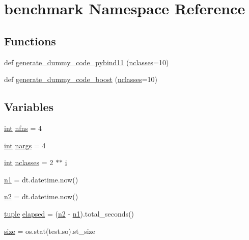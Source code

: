 \hypertarget{namespacebenchmark}{}\section{benchmark Namespace Reference}
\label{namespacebenchmark}
\subsection*{Functions}
\begin{DoxyCompactItemize}
\item 
def \mbox{\hyperlink{namespacebenchmark_a5359521e823a327e1afc7a83d99fa73e}{generate\+\_\+dummy\+\_\+code\+\_\+pybind11}} (\mbox{\hyperlink{namespacebenchmark_ae3ff13572a7f8a6a9bf2bff520478379}{nclasses}}=10)
\item 
def \mbox{\hyperlink{namespacebenchmark_a714bbeed8f2f2b196b7ef86e3d37f312}{generate\+\_\+dummy\+\_\+code\+\_\+boost}} (\mbox{\hyperlink{namespacebenchmark_ae3ff13572a7f8a6a9bf2bff520478379}{nclasses}}=10)
\end{DoxyCompactItemize}
\subsection*{Variables}
\begin{DoxyCompactItemize}
\item 
\mbox{\hyperlink{warnings_8h_a74f207b5aa4ba51c3a2ad59b219a423b}{int}} \mbox{\hyperlink{namespacebenchmark_a08ef92e0d411609912c8368efd85e34e}{nfns}} = 4
\item 
\mbox{\hyperlink{warnings_8h_a74f207b5aa4ba51c3a2ad59b219a423b}{int}} \mbox{\hyperlink{namespacebenchmark_aad31ff2d4ed162d708367b63f9484c97}{nargs}} = 4
\item 
\mbox{\hyperlink{warnings_8h_a74f207b5aa4ba51c3a2ad59b219a423b}{int}} \mbox{\hyperlink{namespacebenchmark_ae3ff13572a7f8a6a9bf2bff520478379}{nclasses}} = 2 $\ast$$\ast$ \mbox{\hyperlink{abstract_8h_a13235ab5ddf5c2ccd5ca35ab01d91328}{i}}
\item 
\mbox{\hyperlink{namespacebenchmark_a6fb7f885fb53a5264b524e52be7c7fed}{n1}} = dt.\+datetime.\+now()
\item 
\mbox{\hyperlink{namespacebenchmark_a5a772e99afcb2da6f2ca2237dbb48840}{n2}} = dt.\+datetime.\+now()
\item 
\mbox{\hyperlink{classtuple}{tuple}} \mbox{\hyperlink{namespacebenchmark_aa84b82587deca84da9db059c28668891}{elapsed}} = (\mbox{\hyperlink{namespacebenchmark_a5a772e99afcb2da6f2ca2237dbb48840}{n2}} -\/ \mbox{\hyperlink{namespacebenchmark_a6fb7f885fb53a5264b524e52be7c7fed}{n1}}).total\+\_\+seconds()
\item 
\mbox{\hyperlink{namespacebenchmark_a9e6154833c009e11ef47e8ed87da54fa}{size}} = os.\+stat(\textquotesingle{}test.\+so\textquotesingle{}).st\+\_\+size
\end{DoxyCompactItemize}


